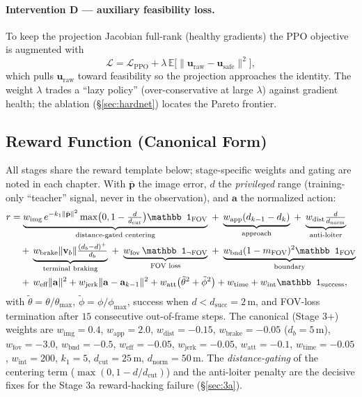 \documentclass[11pt]{article}
\begin{document}
\paragraph{Intervention D --- auxiliary feasibility loss.} To keep the
projection Jacobian full-rank (healthy gradients) the PPO objective is
augmented with
\begin{equation}
\mathcal L=\mathcal L_\text{PPO}
+\lambda\,\mathbb E\big[\lVert\mathbf u_\text{raw}-\mathbf u_\text{safe}\rVert^2\big],
\end{equation}
which pulls $\mathbf u_\text{raw}$ toward feasibility so the projection
approaches the identity. The weight $\lambda$ trades a ``lazy policy''
(over-conservative at large $\lambda$) against gradient health; the ablation
(\S\ref{sec:hardnet}) locates the Pareto frontier.

\subsection{Reward Function (Canonical Form)}
\label{sec:reward}
All stages share the reward template below; stage-specific weights and gating
are noted in each chapter. With $\bar{\mathbf p}$ the image error, $d$ the
\emph{privileged} range (training-only ``teacher'' signal, never in the
observation), and $\mathbf a$ the normalized action:
\begin{align}
r &= \underbrace{w_\text{img}\,e^{-k_1\lVert\bar{\mathbf p}\rVert^2}\max\!\big(0,1-\tfrac{d}{d_\text{cut}}\big)\mathbb 1_\text{FOV}}_{\text{distance-gated centering}}
\;+\;\underbrace{w_\text{app}(d_{k-1}-d_k)}_{\text{approach}}
\;+\;\underbrace{w_\text{dist}\tfrac{d}{d_\text{norm}}}_{\text{anti-loiter}}\notag\\
&\quad+\,\underbrace{w_\text{brake}\lVert\mathbf v_b\rVert\tfrac{(d_b-d)^+}{d_b}}_{\text{terminal braking}}
\;+\;\underbrace{w_\text{fov}\,\mathbb 1_{\neg\text{FOV}}}_{\text{FOV loss}}
\;+\;\underbrace{w_\text{bnd}(1-m_\text{FOV})^2\mathbb 1_\text{FOV}}_{\text{boundary}}\notag\\
&\quad+\,w_\text{eff}\lVert\mathbf a\rVert^2
+ w_\text{jerk}\lVert\mathbf a-\mathbf a_{k-1}\rVert^2
+ w_\text{att}\big(\tilde\theta^2+\tilde\phi^2\big)
+ w_\text{time}
+ w_\text{int}\mathbb 1_\text{success},
\label{eq:reward}
\end{align}
with $\tilde\theta=\theta/\theta_{\max}$, $\tilde\phi=\phi/\phi_{\max}$,
success when $d<d_\text{succ}=2\,$m, and FOV-loss termination after
$15$ consecutive out-of-frame steps. The canonical (Stage 3+) weights are
$w_\text{img}{=}0.4$, $w_\text{app}{=}2.0$, $w_\text{dist}{=}-0.15$,
$w_\text{brake}{=}-0.05$ ($d_b{=}5\,$m), $w_\text{fov}{=}-3.0$,
$w_\text{bnd}{=}-0.5$, $w_\text{eff}{=}-0.05$, $w_\text{jerk}{=}-0.05$,
$w_\text{att}{=}-0.1$, $w_\text{time}{=}-0.05$, $w_\text{int}{=}200$,
$k_1{=}5$, $d_\text{cut}{=}25\,$m, $d_\text{norm}{=}50\,$m. The
\emph{distance-gating} of the centering term ($\max(0,1-d/d_\text{cut})$) and
the anti-loiter penalty are the decisive fixes for the Stage 3a reward-hacking
failure (\S\ref{sec:3a}).
\end{document}
